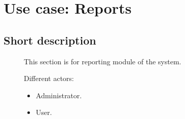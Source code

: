 	\section{Use case: Reports}
	\subsection{Short description}
	\begin{description}
		
		\item[] 
			This section is for reporting module of the system. 
		
		\item[] Different actors:
		\begin{itemize}
			\item Administrator.
			\item User.   
		\end{itemize}
		
	\end{description}
	

